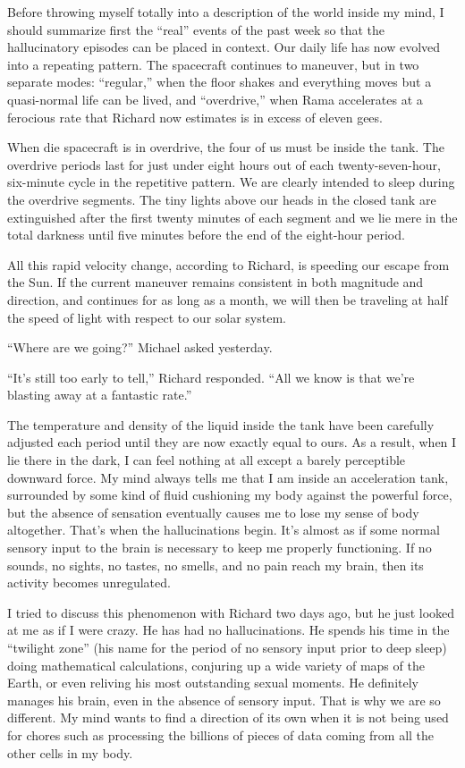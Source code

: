 \documentclass[]{article}
\begin{document}
Before throwing myself totally into a description of the world inside my mind, I should summarize first the “real” events of the past week so that the hallucinatory episodes can be placed in context.  Our daily life has now evolved into a repeating pattern.  The spacecraft continues to maneuver, but in two separate modes: “regular,” when the floor shakes and everything moves but a quasi-normal life can be lived, and “overdrive,” when Rama accelerates at a ferocious rate that Richard now estimates is in excess of eleven gees.

When die spacecraft is in overdrive, the four of us must be inside the tank.  The overdrive periods last for just under eight hours out of each twenty-seven-hour, six-minute cycle in the repetitive pattern.  We are clearly intended to sleep during the overdrive segments.  The tiny lights above our heads in the closed tank are extinguished after the first twenty minutes of each segment and we lie mere in the total darkness until five minutes before the end of the eight-hour period.

All this rapid velocity change, according to Richard, is speeding our escape from the Sun.  If the current maneuver remains consistent in both magnitude and direction, and continues for as long as a month, we will then be traveling at half the speed of light with respect to our solar system.

“Where are we going?” Michael asked yesterday.

“It’s still too early to tell,” Richard responded.  “All we know is that we’re blasting away at a fantastic rate.”

The temperature and density of the liquid inside the tank have been carefully adjusted each period until they are now exactly equal to ours.  As a result, when I lie there in the dark, I can feel nothing at all except a barely perceptible downward force.  My mind always tells me that I am inside an acceleration tank, surrounded by some kind of fluid cushioning my body against the powerful force, but the absence of sensation eventually causes me to lose my sense of body altogether.  That’s when the hallucinations begin.  It’s almost as if some normal sensory input to the brain is necessary to keep me properly functioning.  If no sounds, no sights, no tastes, no smells, and no pain reach my brain, then its activity becomes unregulated.

I tried to discuss this phenomenon with Richard two days ago, but he just looked at me as if I were crazy.  He has had no hallucinations.  He spends his time in the “twilight zone” (his name for the period of no sensory input prior to deep sleep) doing mathematical calculations, conjuring up a wide variety of maps of the Earth, or even reliving his most outstanding sexual moments.  He definitely manages his brain, even in the absence of sensory input.  That is why we are so different.  My mind wants to find a direction of its own when it is not being used for chores such as processing the billions of pieces of data coming from all the other cells in my body.
\end{document}
